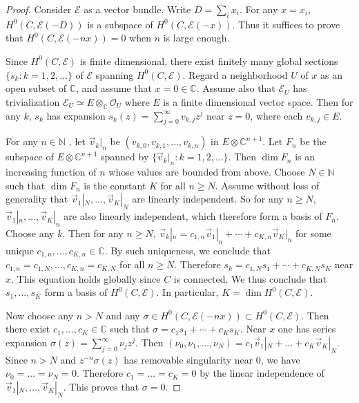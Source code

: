 \documentclass[12pt,b5paper,notitlepage]{report}
\theoremstyle{definition}
\theoremstyle{plain}
\newcommand{\scr}{\mathscr}
\newcommand{\Cbb}{\mathbb C}
\numberwithin{equation}{section}
\begin{document}
\begin{proof}
Consider $\scr E$ as a vector bundle. Write $D=\sum_i x_i$. For any $x=x_i$, $H^0(C,\scr E(-D))$ is a subspace of $H^0(C,\scr E(-x))$. Thus it suffices to prove that $H^0(C,\scr E(-nx))=0$ when $n$ is large enough. 

Since $H^0(C,\scr E)$ is finite dimensional, there exist finitely many global sections $\{s_k:k=1,2,\dots \}$ of $\scr E$ spanning $H^0(C,\scr E)$. Regard a neighborhood $U$ of $x$ as an open subset of $\Cbb$, and assume that $x=0\in\mathbb C$. Assume also that $\scr E_U$ has trivialization $\scr E_U\simeq E\otimes_{\mathbb C} \scr O_U$ where $E$ is a finite dimensional vector space. Then for any $k$, $s_k$ has expansion $s_k(z)=\sum_{j=0}^{\infty}v_{k,j}z^j$ near $z=0$, where each $v_{k,j}\in E$.

For any $n\in\mathbb N$ , let $\vec{v}_k|_n$ be $(v_{k,0},v_{k,1},\dots,v_{k,n})$ in $E\otimes\mathbb C^{n+1}$. Let $F_n$ be the subspace of $E\otimes\mathbb C^{n+1}$ spanned by $\{\vec{v}_k|_n:k=1,2,\dots\}$. Then $\dim F_n$ is an increasing function of $n$ whose values are bounded from above. Choose $N\in\mathbb N$ such that $\dim F_n$ is the constant $K$ for all $n\geq N$. Assume without loss of generality that $\vec{v}_1|_N,\dots,\vec{v}_K|_N$ are linearly independent. So for any $n\geq N$, $\vec{v}_1|_n,\dots,\vec{v}_K|_n$ are also linearly independent, which therefore form a basis of $F_n$. Choose any $k$. Then for any $n\geq N$, $\vec{v}_k|_n=c_{1,n}\vec{v}_1|_n+\cdots+c_{K,n}\vec{v}_K|_n$ for some unique $c_{1,n},\dots,c_{K,n}\in\mathbb C$. By such uniqueness, we conclude that $c_{1,n}=c_{1,N},\dots,c_{K,n}=c_{K,N}$ for all $n\geq N$. Therefore $s_k=c_{1,N}s_1+\cdots+c_{K,N}s_K$ near $x$. This equation holds globally since $C$ is connected. We thus conclude that $s_1,\dots, s_K$ form a basis of $H^0(C,\scr E)$. In particular, $K=\dim H^0(C,\scr E)$.

Now choose any $n>N$ and any $\sigma\in H^0(C,\scr E(-nx))\subset H^0(C,\scr E)$. Then there exist $c_1,\dots,c_K\in\mathbb C$ such that $\sigma=c_1s_1+\cdots+c_Ks_K$. Near $x$ one has series expansion $\sigma(z)=\sum_{j=0}^\infty \nu_jz^j$. Then $(\nu_0,\nu_1,\dots,\nu_N)=c_1\vec{v}_1|_N+\dots+c_K\vec{v}_K|_N$. Since $n>N$ and $z^{-n}\sigma(z)$ has removable singularity near $0$, we have $\nu_0=\dots=\nu_N=0$. Therefore $c_1=\dots=c_K=0$ by the linear independence of $\vec{v}_1|_N,\dots,\vec{v}_K|_N$. This proves that $\sigma=0$.
\end{proof}
\end{document}
